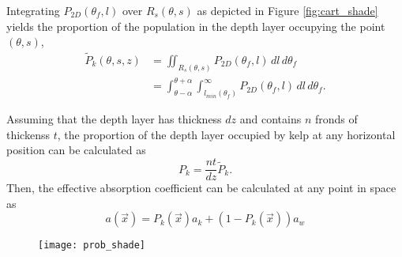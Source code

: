 Integrating $P_{2D}(\theta_f,l)$ over $R_s(\theta,s)$ as depicted in Figure \ref{fig:cart_shade} yields the proportion of the population in the depth layer occupying the point $(\theta,s)$,
\begin{align*}
		\tilde{P}_k(\theta,s,z)	&= \iint_{R_s(\theta,s)}
								P_{2D}(\theta_f,l)
								\,dl\,d\theta_f \nonumber \\
							&= \int_{\theta-\alpha}^{\theta+\alpha} 
								\int_{l_{min}(\theta_f)}^\infty
								P_{2D}(\theta_f,l)
								\,dl\,d\theta_f.
\end{align*}

Assuming that the depth layer has thickness $dz$ and contains $n$ fronds of thickenss $t$,
the proportion of the depth layer occupied by kelp at any horizontal position can be calculated as 
\begin{equation*}
  P_k = \frac{nt}{dz}\tilde{P}_k.
\end{equation*}
Then, the effective absorption coefficient can be calculated at any point in space as
\begin{equation*}
  a(\vec{x}) = P_k(\vec{x})a_k + (1-P_k(\vec{x}))a_w
\end{equation*}

\begin{figure}[h]
	\centering
	\texttt{[image: prob\_shade]}
	\label{fig:prob_shade}
\end{figure}
